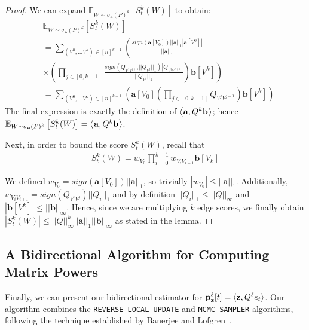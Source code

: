 \begin{proof}
We can expand $\mathbb{E}_{W \sim \sigma_{\mathbf{a}}(P)^k} \left[S_{t}^k(W)\right]$ to obtain:
\small
\begin{align*}
&\mathbb{E}_{W \sim \sigma_{\mathbf{a}}(P)^k} \left[S_{t}^k(W)\right] \\ 
&= \sum_{(V^0, ... V^{k}) \in [n]^{k+1}} \left(\frac{sign(\mathbf{a}[V_0])||\mathbf{a}||_1|\mathbf{a}[V^0]|}{||\mathbf{a}||_1} \right. \\
&\left. \times \left( \prod_{j \in [0, k-1]} \frac{sign(Q_{V^jV^{j+1}}||Q_{V^j}||_1)|Q_{V^jV^{j+1}}|}{||Q_{V^j}||_1} \right) \mathbf{b}[V^k] \right) \\
& = \sum_{(V^0, ... V^{k}) \in [n]^{k+1}} \left(\mathbf{a}[V_0] \left( \prod_{j \in [0, k-1]} Q_{V^jV^{j+1}}\right) \mathbf{b}[V^k] \right)
\end{align*}
\normalsize
The final expression is exactly the definition of $\left< \mathbf{a}, Q^k\mathbf{b} \right>$; hence $\mathbb{E}_{W \sim \sigma_{\mathbf{a}}(P)^k} \left[S_{t}^k(W)\right] = \left< \mathbf{a}, Q^k\mathbf{b} \right>$.


Next, in order to bound the score $S_{t}^k(W)$, recall that
\begin{align*}
S_{t}^k(W) = w_{V_0}\prod_{i=0}^{k-1}w_{V_iV_{i+1}}\mathbf{b}[V_{k}]
\end{align*}

We defined $w_{V_0} = sign(\mathbf{a}[V_0])||\mathbf{a}||_1$, so trivially $|w_{V_0}| \leq ||\mathbf{a}||_1$.
Additionally, $w_{V_iV_{i+1}} = sign(Q_{V^iV^j})||Q_i||_1 $ and by definition $||Q_i||_1  \leq ||Q||_{\infty}$ and $| \mathbf{b}[V^k] |\leq ||\mathbf{b}||_\infty$.
Hence, since we are multiplying $k$ edge scores, we finally obtain
$|S_{t}^k(W)| \leq ||Q||_{\infty}^k||\mathbf{a}||_1||\mathbf{b}||_\infty$ as stated in the lemma.
\end{proof}

\subsection{A Bidirectional Algorithm for Computing Matrix Powers}

Finally, we can present our bidirectional estimator for ${\mathbf{p}}_\mathbf{z}^{\ell}[t] = \langle\mathbf{z},Q^{\ell}e_t\rangle$. 
Our algorithm combines the \texttt{REVERSE-LOCAL-UPDATE} and \texttt{MCMC-SAMPLER} algorithms, following the technique established by Banerjee and Lofgren~\cite{banerjee2015fast}. 

